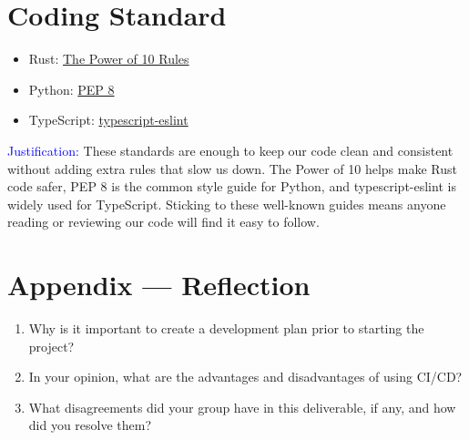 \documentclass{article}
\begin{document}
\section{Coding Standard}

\begin{itemize}
  \item Rust:
        \href{https://en.wikipedia.org/wiki/The_Power_of_10:_Rules_for_Developing_Safety-Critical_Code}{The
          Power of 10 Rules}
  \item Python: \href{https://peps.python.org/pep-0008/}{PEP 8}
  \item TypeScript:
        \href{https://typescript-eslint.io/packages/typescript-eslint}{typescript-eslint}

\end{itemize}

\textcolor{blue}{Justification:} These standards are enough to keep our code clean
and consistent without adding extra rules that slow us down. The Power of 10 helps
make Rust code safer, PEP 8 is the common style guide for Python, and
typescript-eslint is widely used for TypeScript. Sticking to these well-known
guides means anyone reading or reviewing our code will find it easy to follow.


\newpage{}

\section*{Appendix --- Reflection}




\begin{enumerate}
  \item Why is it important to create a development plan prior to starting the project?
  \item In your opinion, what are the advantages and disadvantages of using CI/CD?
  \item What disagreements did your group have in this deliverable, if any, and how did
        you resolve them?
\end{enumerate}

\subsection*{\color{blue}{Jianqing Liu}}
\end{document}
